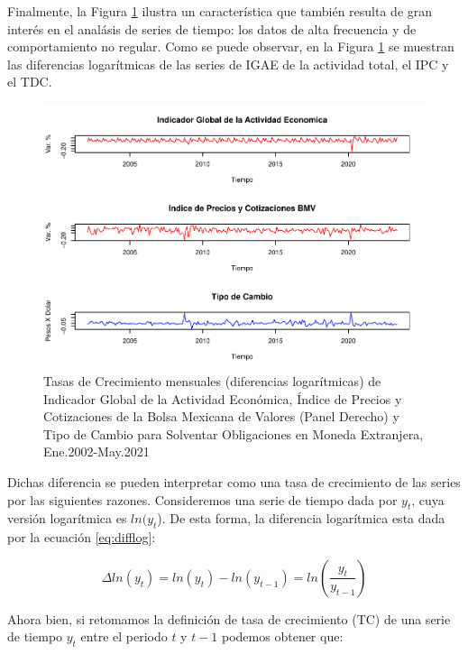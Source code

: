 \documentclass[
]{book}
\begin{document}
Finalmente, la Figura \ref{fig:fig5} ilustra un característica que también resulta de gran interés en el analásis de series de tiempo: los datos de alta frecuencia y de comportamiento no regular. Como se puede observar, en la Figura \ref{fig:fig5} se muestran las diferencias logarítmicas de las series de IGAE de la actividad total, el IPC y el TDC.

\begin{figure}

{\centering \includegraphics{bookdown-demo_files/figure-latex/fig5-1} 

}

\caption{Tasas de Crecimiento mensuales (diferencias logarítmicas) de Indicador Global de la Actividad Económica, Índice de Precios y Cotizaciones de la Bolsa Mexicana de Valores (Panel Derecho) y Tipo de Cambio para Solventar Obligaciones en Moneda Extranjera, Ene.2002-May.2021 }\label{fig:fig5}
\end{figure}

Dichas diferencia se pueden interpretar como una tasa de crecimiento de las series por las siguientes razones. Consideremos una serie de tiempo dada por \(y_t\), cuya versión logarítmica es \(ln(y_t\)). De esta forma, la diferencia logarítmica esta dada por la ecuación \eqref{eq:difflog}:

\begin{equation}
   \Delta ln(y_t) = ln(y_t) - ln(y_{t-1}) = ln \left( \frac{y_t}{y_{t-1}} \right)
   \label{eq:difflog}
\end{equation}

Ahora bien, si retomamos la definición de tasa de crecimiento (TC) de una serie de tiempo \(y_t\) entre el periodo \(t\) y \(t-1\) podemos obtener que:
\end{document}
